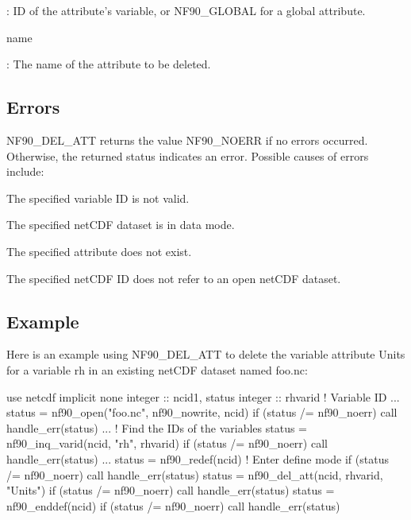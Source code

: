 \+: ID of the attribute’s variable, or N\+F90\+\_\+\+G\+L\+O\+B\+AL for a global attribute.

{\ttfamily name}

\+: The name of the attribute to be deleted.

\subsection*{Errors}

N\+F90\+\_\+\+D\+E\+L\+\_\+\+A\+TT returns the value N\+F90\+\_\+\+N\+O\+E\+RR if no errors occurred. Otherwise, the returned status indicates an error. Possible causes of errors include\+:


\begin{DoxyItemize}
\item The specified variable ID is not valid.
\item The specified net\+C\+DF dataset is in data mode.
\item The specified attribute does not exist.
\item The specified net\+C\+DF ID does not refer to an open net\+C\+DF dataset.
\end{DoxyItemize}

\subsection*{Example}

Here is an example using N\+F90\+\_\+\+D\+E\+L\+\_\+\+A\+TT to delete the variable attribute Units for a variable rh in an existing net\+C\+DF dataset named foo.\+nc\+:


\begin{DoxyCode}
\textcolor{keywordtype}{use }netcdf
\textcolor{keywordtype}{implicit none}
\textcolor{keywordtype}{integer} :: ncid1, status
\textcolor{keywordtype}{integer} :: rhvarid         \textcolor{comment}{! Variable ID}
...
status = nf90\_open(\textcolor{stringliteral}{"foo.nc"}, nf90\_nowrite, ncid)
\textcolor{keywordflow}{if} (status /= nf90\_noerr) \textcolor{keyword}{call }handle\_err(status)
...
\textcolor{comment}{! Find the IDs of the variables}
status = nf90\_inq\_varid(ncid, \textcolor{stringliteral}{"rh"}, rhvarid)
\textcolor{keywordflow}{if} (status /= nf90\_noerr) \textcolor{keyword}{call }handle\_err(status)
...
status = nf90\_redef(ncid)   \textcolor{comment}{! Enter define mode}
\textcolor{keywordflow}{if} (status /= nf90\_noerr) \textcolor{keyword}{call }handle\_err(status)
status = nf90\_del\_att(ncid, rhvarid, \textcolor{stringliteral}{"Units"})
\textcolor{keywordflow}{if} (status /= nf90\_noerr) \textcolor{keyword}{call }handle\_err(status)
status = nf90\_enddef(ncid)
\textcolor{keywordflow}{if} (status /= nf90\_noerr) \textcolor{keyword}{call }handle\_err(status)
\end{DoxyCode}
 